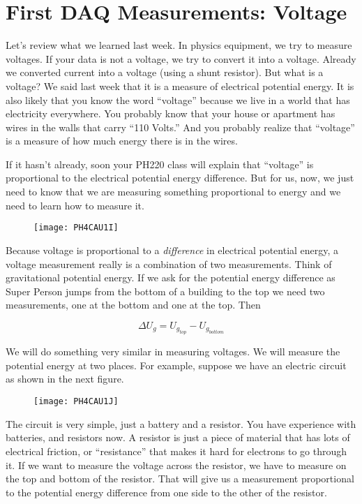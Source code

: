 \chapter{First DAQ Measurements: Voltage}
Let's review what we learned last week. In physics equipment, we try to
measure voltages. If your data is not a voltage, we try to convert it into a voltage. Already we converted current into a voltage (using a shunt resistor). But what is a voltage? We said last week that it is a measure of electrical potential energy. It is also likely that you know the word ``voltage'' because we live in a world that has electricity everywhere. You probably know that your house or apartment has wires in the walls that carry ``110 Volts.'' And you probably realize that ``voltage'' is a measure of how much energy there is in the wires.

If it hasn't already, soon your PH220 class will explain that ``voltage'' is proportional to the electrical potential energy difference. But for us, now, we just need to know that we are measuring something proportional to energy and we need to learn how to measure it.

\begin{figure}[h!]
	\centering
	\texttt{[image: PH4CAU1I]}
\end{figure}

Because voltage is proportional to a \emph{difference} in electrical potential energy, a voltage measurement really is a combination of two measurements. Think of gravitational potential energy. If we ask for the potential energy difference as Super Person jumps from the bottom of a building to the top we need two measurements, one at the bottom and one at the top. Then 

\begin{equation*}
	\Delta U_{g}=U_{g_{top}}-U_{g_{bottom}}
\end{equation*}

We will do something very similar in measuring voltages. We will measure the potential energy at two places. For example, suppose we have an electric circuit as shown in the next figure. 

\begin{figure}[h!]
	\centering	
    \texttt{[image: PH4CAU1J]}
\end{figure}

The circuit is very simple, just a battery and a resistor. You have experience with batteries, and resistors now. A resistor is just a piece of material that has lots of electrical friction, or ``resistance'' that makes it hard for electrons to go through it. If we want to measure the voltage across the resistor, we have to measure on the top and bottom of the resistor. That will give us a measurement proportional to the potential energy difference from one side to the other of the resistor.


